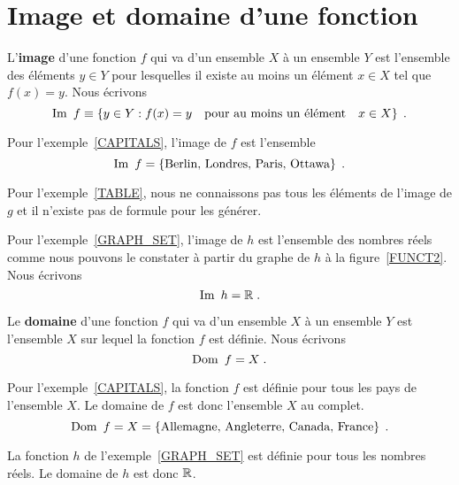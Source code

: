 {\section{Image et domaine d'une fonction}

\begin{defn} 
L'{\bfseries image} d'une fonction $f$ qui va
d'un ensemble $X$ à un ensemble $Y$ est l'ensemble des éléments $y \in Y$
pour lesquelles il existe au moins un élément $x \in X$ tel que
$f(x) = y$.  Nous écrivons
\[
\IM f \equiv \left\{ y \in Y : f(x) = y \quad
\text{pour au moins un élément} \quad x \in X \right\} \; .
\]
\end{defn}

\begin{egg}
Pour l'exemple~\ref{CAPITALS}, l'image de $f$ est l'ensemble
\[
\IM f = \left\{ \text{Berlin, Londres, Paris, Ottawa} \right\} \; .
\]
\end{egg}

\begin{rmk}
Pour l'exemple~\ref{TABLE}, nous ne connaissons pas tous les éléments de
l'image de $g$ et il n'existe pas de formule pour les générer.
\end{rmk}

\begin{egg}
Pour l'exemple~\ref{GRAPH_SET}, l'image de $h$ est l'ensemble des
nombres réels comme nous pouvons le constater à partir du graphe de $h$ à
la figure~\ref{FUNCT2}.  Nous écrivons
\[
\IM h = \RR\; .
\]
\end{egg}

\begin{defn} 
Le {\bfseries domaine} d'une fonction $f$ qui
va d'un ensemble $X$ à un ensemble $Y$ est l'ensemble $X$ sur lequel
la fonction $f$ est définie.  Nous écrivons
\[
\DO f = X \; .
\]
\end{defn}

\begin{egg}
Pour l'exemple~\ref{CAPITALS}, la fonction $f$ est définie pour tous
les pays de l'ensemble $X$.  Le domaine de $f$ est donc l'ensemble
$X$ au complet.
\[
\DO f = X = \left\{ \text{Allemagne, Angleterre, Canada, France}
\right\} \; .
\]
\end{egg}

\begin{egg}
La fonction $h$ de l'exemple~\ref{GRAPH_SET} est définie pour tous les
nombres réels.  Le domaine de $h$ est donc $\mathbb{R}$.
\end{egg}

}
